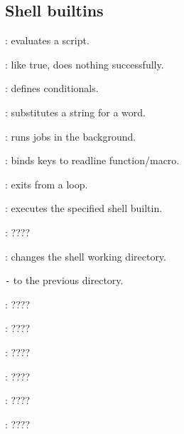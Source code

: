 \subsection{Shell builtins}
\begin{compactenum}
\item [\symbolbash] : evaluates a script.

\item [\symbolbash] \commandbash{:}: like true, does nothing successfully.

\item [\symbolbash] \commandbash{[}: defines conditionals.

\item [\symbolbash] : substitutes a string for a word.

\item [\symbolbash] : runs jobs in the background.

\item [\symbolbash] : binds keys to readline function/macro.

\item [\symbolbash] : exits from a loop.

\item [\symbolbash] : executes the specified shell builtin.

\item [\symbolbash] : \dotfill ????

\item [\symbolbash] : changes the shell working directory.
\item [\texttt{-}] to the previous directory.

\item [\symbolbash] : \dotfill ????

\item [\symbolbash] : \dotfill ????

\item [\symbolbash] : \dotfill ????

\item [\symbolbash] : \dotfill ????

\item [\symbolbash] : \dotfill ????

\item [\symbolbash] : \dotfill ????


\end{compactenum}
